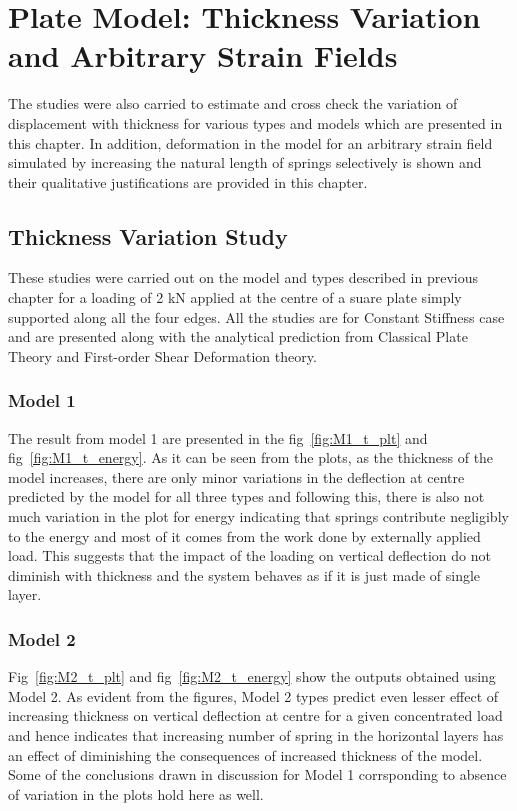 \chapter{Plate Model: Thickness Variation and Arbitrary Strain Fields}

The studies were also carried to estimate and cross check the variation of displacement with thickness for various types and models which are presented in this chapter. In addition, deformation in the model for an arbitrary strain field simulated by increasing the natural length of springs selectively is shown and their qualitative justifications are provided in this chapter.

\section{Thickness Variation Study}
 These studies were carried out on the model and types described in previous chapter for a loading of 2 kN applied at the centre of a suare plate simply supported along all the four edges. All the studies are for Constant Stiffness case and are presented along with the analytical prediction from Classical Plate Theory and First-order Shear Deformation theory.
 
 \subsection{Model 1}
 The result from model 1 are presented in the fig~\ref{fig:M1_t_plt} and fig~\ref{fig:M1_t_energy}. As it can be seen from the plots, as the thickness of the model increases, there are only minor variations in the deflection at centre predicted by the model for all three types and following this, there is also not much variation in the plot for energy indicating that springs contribute negligibly to the energy and most of it comes from the work done by externally applied load. This suggests that the impact of the loading on vertical deflection do not diminish with thickness and the system behaves as if it is just made of single layer. 
 
  \subsection{Model 2}
 Fig~\ref{fig:M2_t_plt} and fig~\ref{fig:M2_t_energy} show the outputs obtained using Model 2. As evident from the figures, Model 2 types predict even lesser effect of increasing thickness on vertical deflection at centre for a given concentrated load and hence indicates that increasing number of spring in the horizontal layers has an effect of diminishing the consequences of increased thickness of the model. Some of the conclusions drawn in discussion for Model 1 corrsponding to absence of variation in the plots hold here as well.
 
